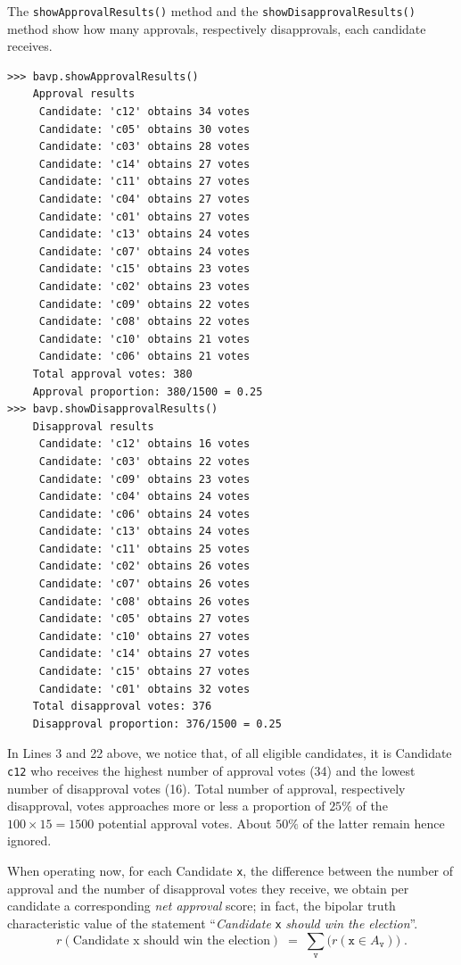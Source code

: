 The \texttt{showApprovalResults()} method and the \texttt{showDisapproval\-Results()} method show how many approvals, respectively disapprovals, each candidate receives.
\begin{lstlisting}
>>> bavp.showApprovalResults()
    Approval results
     Candidate: 'c12' obtains 34 votes
     Candidate: 'c05' obtains 30 votes
     Candidate: 'c03' obtains 28 votes
     Candidate: 'c14' obtains 27 votes
     Candidate: 'c11' obtains 27 votes
     Candidate: 'c04' obtains 27 votes
     Candidate: 'c01' obtains 27 votes
     Candidate: 'c13' obtains 24 votes
     Candidate: 'c07' obtains 24 votes
     Candidate: 'c15' obtains 23 votes
     Candidate: 'c02' obtains 23 votes
     Candidate: 'c09' obtains 22 votes
     Candidate: 'c08' obtains 22 votes
     Candidate: 'c10' obtains 21 votes
     Candidate: 'c06' obtains 21 votes
    Total approval votes: 380
    Approval proportion: 380/1500 = 0.25
>>> bavp.showDisapprovalResults()
    Disapproval results
     Candidate: 'c12' obtains 16 votes
     Candidate: 'c03' obtains 22 votes
     Candidate: 'c09' obtains 23 votes
     Candidate: 'c04' obtains 24 votes
     Candidate: 'c06' obtains 24 votes
     Candidate: 'c13' obtains 24 votes
     Candidate: 'c11' obtains 25 votes
     Candidate: 'c02' obtains 26 votes
     Candidate: 'c07' obtains 26 votes
     Candidate: 'c08' obtains 26 votes
     Candidate: 'c05' obtains 27 votes
     Candidate: 'c10' obtains 27 votes
     Candidate: 'c14' obtains 27 votes
     Candidate: 'c15' obtains 27 votes
     Candidate: 'c01' obtains 32 votes
    Total disapproval votes: 376
    Disapproval proportion: 376/1500 = 0.25
\end{lstlisting}

In Lines 3 and 22 above, we notice that, of all eligible candidates, it is Candidate \texttt{c12} who receives the highest number of approval votes (34) and the lowest number of disapproval votes (16). Total number of approval, respectively disapproval, votes approaches more or less a proportion of $25\%$ of the $100 \times 15 = 1500$ potential approval votes. About $50\%$ of the latter remain hence ignored. 

When operating now, for each Candidate \texttt{x}, the difference between the number of approval and the number of disapproval votes they receive, we obtain per candidate a corresponding \emph{net approval} score; in fact, the bipolar truth characteristic value of the statement ``\emph{Candidate} \texttt{x} \emph{should win the election}''.
\begin{equation}
r(\text{Candidate x should win the election}) \;=\; \sum_{\mathtt{v}} \big(r(\mathtt{x} \in A_{\mathtt{v}})\big)\;.
\end{equation}

